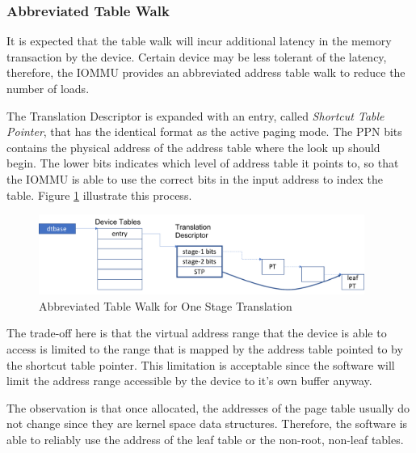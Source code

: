 
\subsubsection{Abbreviated Table Walk}

It is expected that the table walk will incur additional latency in the memory transaction
by the device. Certain device may be less tolerant of the latency, therefore, the IOMMU
provides an abbreviated address table walk to reduce the number of loads.

The Translation Descriptor is expanded with an entry, called \textit{Shortcut Table
Pointer}, that has the identical format as the
active paging mode. The PPN bits contains the physical address of the address table where
the look up should begin. The lower bits indicates which level of address table it points
to, so that the IOMMU is able to use the correct bits in the input address to index the
table. Figure \ref{fig:atw} illustrate this process.

\begin{figure}[ht!]
    \centering
    \includegraphics[width=0.95\textwidth]{img/atw.pdf}
    \caption{Abbreviated Table Walk for One Stage Translation}
    \label{fig:atw}
\end{figure}

The trade-off here is that the virtual address range that the device is able to access is
limited to the range that is mapped by the address table pointed to by the shortcut table
pointer.  This limitation is acceptable since the software will limit the address range
accessible by the device to it's own buffer anyway.

\note The observation is that once allocated, the addresses of the page table usually do
not change since they are kernel space data structures. Therefore, the software is able to
reliably use the address of the leaf table or the non-root, non-leaf tables. \noteend

